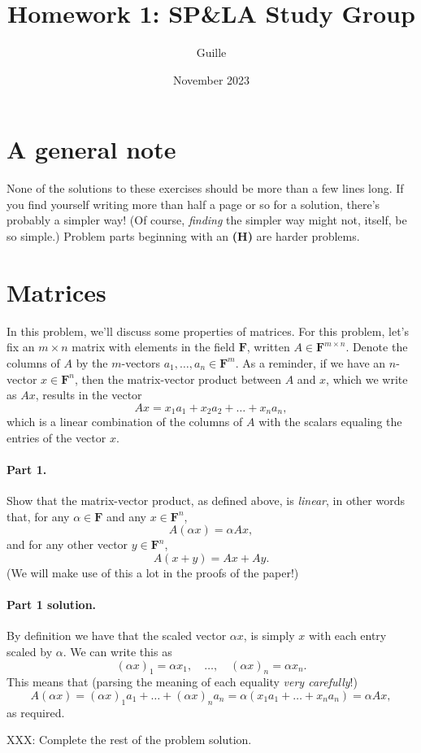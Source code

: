 \documentclass[12pt]{article}
\title{Homework 1: SP\&LA Study Group}
\author{Guille}
\date{November 2023}
\newcommand{\field}{\mathbf{F}}
\begin{document}
 
\maketitle 

\section*{A general note}
None of the solutions to these exercises should be more than a few lines long.
If you find yourself writing more than half a page or so for a solution,
there's probably a simpler way! (Of course, \emph{finding} the simpler way
might not, itself, be so simple.) Problem parts beginning with an {\bf (H)} are
harder problems.

\section{Matrices}
In this problem, we'll discuss some properties of matrices. For this problem,
let's fix an $m\times n$ matrix with elements in the field $\field$, written $A
\in \field^{m\times n}$. Denote the columns of $A$ by the $m$-vectors $a_1,
\dots, a_n \in \field^m$. As a reminder, if we have an $n$-vector $x \in
\field^n$, then the matrix-vector product between $A$ and $x$, which we write
as $Ax$, results in the vector
\begin{equation}\label{eq:mat-mul}
    Ax = x_1a_1 + x_2a_2 + \dots + x_n a_n,
\end{equation}
which is a linear combination of the columns of $A$ with the scalars
equaling the entries of the vector $x$.

\paragraph{Part 1.} Show that the matrix-vector product, as defined above, is
\emph{linear}, in other words that, for any $\alpha \in \field$ and any $x \in
\field^n$,
\[
    A(\alpha x) = \alpha Ax,
\]
and for any other vector $y \in \field^n$,
\[
    A(x + y) = Ax + Ay.
\]
(We will make use of this a lot in the proofs of the paper!)

\begin{solution}
\paragraph{Part 1 solution.} By definition we have that the scaled
vector $\alpha x$, is simply $x$ with each entry scaled by $\alpha$.
We can write this as
\[
    (\alpha x)_1 = \alpha x_1, \quad \dots, \quad (\alpha x)_n = \alpha x_n.
\]
This means that (parsing the meaning of each equality \emph{very carefully}!)
\[
    A(\alpha x) = (\alpha x)_1a_1 + \dots + (\alpha x)_na_n = \alpha (x_1 a_1 + \dots + x_n a_n) = \alpha Ax,
\]
as required.

XXX: Complete the rest of the problem solution.
\end{solution}
\end{document}
